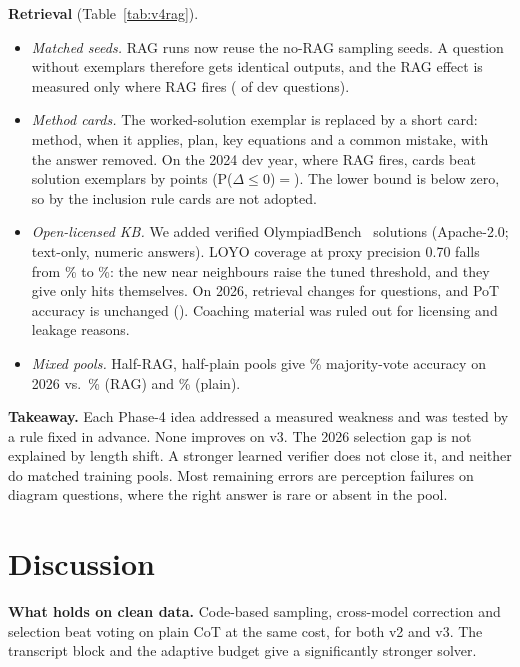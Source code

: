 \documentclass[conference]{IEEEtran}
\begin{document}


\textbf{Retrieval} (Table~\ref{tab:v4rag}).
\begin{itemize}
\item \emph{Matched seeds.} RAG runs now reuse the no-RAG sampling seeds. A question without
exemplars therefore gets identical outputs, and the RAG effect is measured only where RAG fires
(\VfFired{} of \VfDevQ{} dev questions).
\item \emph{Method cards.} The worked-solution exemplar is replaced by a short card: method, when
it applies, plan, key equations and a common mistake, with the answer removed. On the 2024 dev
year, where RAG fires, cards beat solution exemplars by \VfCardSol{} points
(P($\Delta{\le}0$)${=}$\VfCardSolP). The lower bound is below zero, so by the inclusion rule cards
are not adopted.
\item \emph{Open-licensed KB.} We added \VfOlyEntries{} verified OlympiadBench~\cite{olympiadbench}
solutions (Apache-2.0; text-only, numeric answers). LOYO coverage at proxy precision 0.70 falls
from \VfCovThree\% to \VfCovFour\%: the new near neighbours raise the tuned threshold, and they
give only \VfOlyHits{} hits themselves. On 2026, retrieval changes for \VfKbChanged{} questions,
and PoT accuracy is unchanged (\VfKbAll). Coaching material was ruled out for licensing and
leakage reasons.
\item \emph{Mixed pools.} Half-RAG, half-plain pools give \VfMixed\% majority-vote accuracy on
2026 vs.\ \VfMixRag\% (RAG) and \VfMixPot\% (plain).
\end{itemize}

\textbf{Takeaway.} Each Phase-4 idea addressed a measured weakness and was tested by a rule fixed
in advance. None improves on v3. The 2026 selection gap is not explained by length shift. A
stronger learned verifier does not close it, and neither do matched training pools. Most
remaining errors are perception failures on diagram questions, where the right answer is rare or
absent in the pool.

\section{Discussion}
\textbf{What holds on clean data.} Code-based sampling, cross-model correction and selection beat
voting on plain CoT at the same cost, for both v2 and v3. The transcript block and the adaptive
budget give a significantly stronger solver.
\end{document}
